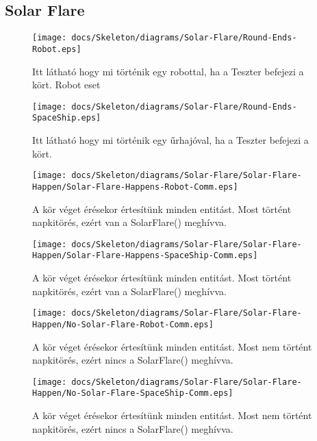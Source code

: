 \subsection{Solar Flare}

\begin{figure}[H] 
    \centering 
    \texttt{[image: docs/Skeleton/diagrams/Solar-Flare/Round-Ends-Robot.eps]} 
    \caption{Itt látható hogy mi történik egy robottal, ha a Teszter befejezi a kört. Robot eset} 
\end{figure}

\begin{figure}[H] 
    \centering 
    \texttt{[image: docs/Skeleton/diagrams/Solar-Flare/Round-Ends-SpaceShip.eps]} 
    \caption{Itt látható hogy mi történik egy űrhajóval, ha a Teszter befejezi a kört.} 
\end{figure}

\begin{figure}[H] 
    \centering 
    \texttt{[image: docs/Skeleton/diagrams/Solar-Flare/Solar-Flare-Happen/Solar-Flare-Happens-Robot-Comm.eps]} 
    \caption{A kör véget érésekor értesítünk minden entitást. Most történt napkitörés, ezért van a SolarFlare() meghívva.} 
\end{figure}

\begin{figure}[H] 
    \centering 
    \texttt{[image: docs/Skeleton/diagrams/Solar-Flare/Solar-Flare-Happen/Solar-Flare-Happens-SpaceShip-Comm.eps]} 
    \caption{A kör véget érésekor értesítünk minden entitást. Most történt napkitörés, ezért van a SolarFlare() meghívva.} 
\end{figure} 

\begin{figure}[H] 
    \centering 
    \texttt{[image: docs/Skeleton/diagrams/Solar-Flare/Solar-Flare-Happen/No-Solar-Flare-Robot-Comm.eps]} 
    \caption{A kör véget érésekor értesítünk minden entitást. Most nem történt napkitörés, ezért nincs a SolarFlare() meghívva.} 
\end{figure}

\begin{figure}[H] 
    \centering 
    \texttt{[image: docs/Skeleton/diagrams/Solar-Flare/Solar-Flare-Happen/No-Solar-Flare-SpaceShip-Comm.eps]} 
    \caption{A kör véget érésekor értesítünk minden entitást. Most nem történt napkitörés, ezért nincs a SolarFlare() meghívva.} 
\end{figure}

